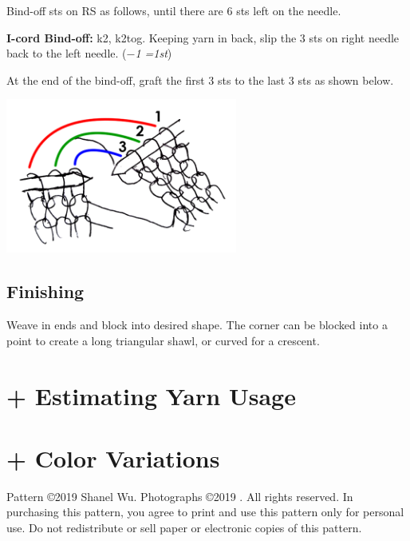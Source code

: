 \documentclass[12pt]{article}
\newcommand{\rowDir}[1]{\textbf{#1:}} %
\newcommand{\blank}{\underline{\hspace{2em}} } %
\newcommand{\decrease}[1]{(\emph{$-$#1
	\ifnum#1=1{st}\else{sts}\fi})}
\newenvironment{frnote}
    {%
    	\def\FrameCommand{\fboxrule=\FrameRule\fboxsep=\FrameSep \fcolorbox{framecolor}{shadecolor}}
    	\MakeFramed {\advance\hsize-\width\FrameRestore}}
    {\endMakeFramed}
\begin{document}
\begin{multicols}{2}
Bind-off sts on RS as follows, until there are 6 sts left on the needle.

\rowDir{I-cord Bind-off} k2, k2tog. Keeping yarn in back, slip the 3 sts on right needle back to the left needle. \decrease{1}

At the end of the bind-off, graft the first 3 sts to the last 3 sts as shown below.

\vspace{-1em}
\begin{center}
\includegraphics[height=2in]{kitchener.png}
\end{center}

\newpage

\subsection*{Finishing}

Weave in ends and block into desired shape. The corner can be blocked into a point to create a long triangular shawl, or curved for a crescent.

\section*{+ Estimating Yarn Usage}

\section*{+ Color Variations}


\begin{frnote} \ssmall
Pattern \copyright 2019 Shanel Wu. Photographs \copyright 2019 \blank. %
All rights reserved. In purchasing this pattern, you agree to print and use this pattern only for personal use. Do not redistribute or sell paper or electronic copies of this pattern.
\end{frnote}

\end{multicols}
\end{document}
